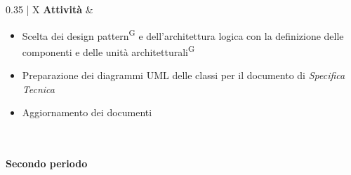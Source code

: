 \begin{xltabular}{\textwidth}{{0.35\textwidth} | X}
    \textbf{Attività} 
    & \begin{itemize}[topsep=0pt]
        \item Scelta dei design pattern\textsuperscript{G} e dell'architettura logica con la definizione delle componenti e delle unità architetturali\textsuperscript{G}
        \item Preparazione dei diagrammi UML delle classi per il documento di \textit{Specifica Tecnica} 
        \item Aggiornamento dei documenti
    \end{itemize} \\
    \hline

\caption{Tabella descrittiva del periodo 1 progettazione e codifica dettaglio}\label{tab:periodo4_1}
\end{xltabular}

\paragraph{Secondo periodo}\label{sec:pianificazione:prog_codifica:periodi:secondo}

